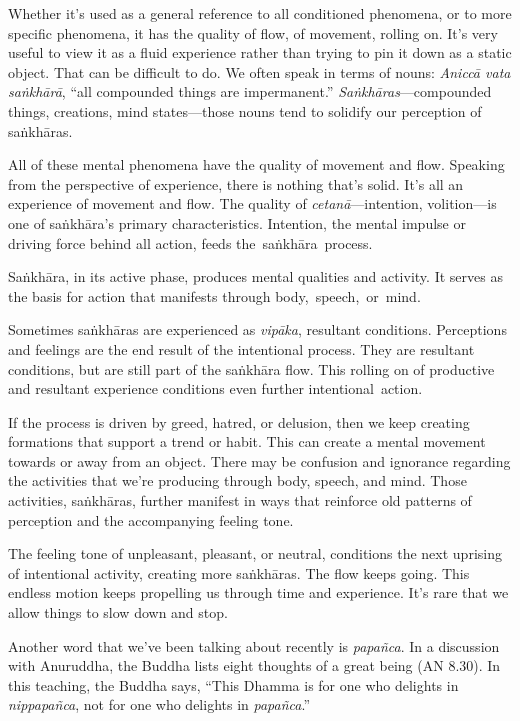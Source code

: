 Whether it's used as a general reference to all conditioned phenomena, or to more specific phenomena, it has the quality of flow, of movement, rolling on. It's very useful to view it as a fluid experience rather than trying to pin it down as a static object. That can be difficult to do. We often speak in terms of nouns: \emph{Aniccā vata saṅkhārā}, ``all compounded things are impermanent.'' \emph{Saṅkhāras}---compounded things, creations, mind states---those nouns tend to solidify our perception of saṅkhāras.

All of these mental phenomena have the quality of \mbox{movement} and flow. Speaking from the perspective of experience, there is nothing that's solid. It's all an experience of movement and flow. The quality of \emph{cetanā}---intention, volition---is one of saṅkhāra's primary characteristics. Intention, the mental impulse or driving force behind all action, feeds \mbox{the saṅkhāra process.}

Saṅkhāra, in its active phase, produces mental qualities and activity. It serves as the basis for action that manifests through \mbox{body, speech, or mind}.

Sometimes saṅkhāras are experienced as \emph{vipāka}, resultant conditions. Perceptions and feelings are the end result of the intentional process. They are resultant conditions, but are still part of the saṅkhāra flow. This rolling on of productive and resultant experience conditions even further \mbox{intentional action.}

\enlargethispage{1\baselineskip}
If the process is driven by greed, hatred, or delusion, then we keep creating formations that support a trend or habit. This can create a mental movement towards or away from an object. There may be confusion and ignorance regarding the activities that we're producing through body, speech, and mind. Those activities, saṅkhāras, further manifest in ways that reinforce old patterns of perception and the accompanying feeling tone.

The feeling tone of unpleasant, pleasant, or neutral, conditions the next uprising of intentional activity, creating more saṅkhāras. The flow keeps going. This endless motion keeps propelling us through time and experience. It's rare that we allow things to slow down and stop.

Another word that we've been talking about recently is \emph{papañca}. In a discussion with Anuruddha, the Buddha lists eight thoughts of a great being (AN 8.30). In this teaching, the Buddha says, ``This Dhamma is for one who delights in \emph{nippapañca}, not for one who delights in \emph{papañca}.''

